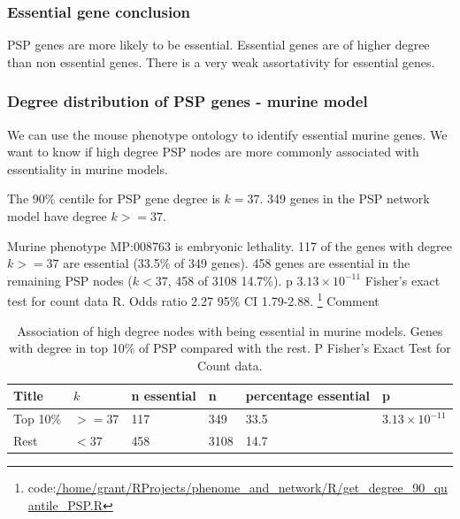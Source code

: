 \subsubsection{Essential gene conclusion}
PSP genes are more likely to be essential. Essential genes are of higher degree than non essential genes. There is a very weak assortativity for essential genes. 


 \subsubsection{Degree distribution of PSP genes - murine model}
 
 We can use the mouse phenotype ontology to identify essential murine genes. 
 We want to know if high degree PSP nodes are more commonly associated with essentiality in murine models. 
 
 The 90\% centile for PSP gene degree is $k=37$. 349 genes in the PSP network model have degree $k>=37$.
 
 Murine phenotype MP:008763 is embryonic lethality. 117 of the genes with degree $k>=37$ are essential (33.5\% of 349 genes). 458 genes are essential in the remaining PSP nodes ($k < 37$, 458 of 3108 14.7\%). p $3.13 \times 10^{-11}$ Fisher's exact test for count data R. Odds ratio 2.27 95\% CI 1.79-2.88. \footnote{code:\url{/home/grant/RProjects/phenome_and_network/R/get_degree_90_quantile_PSP.R}}  Comment 
 
 \begin{table}[h]
     \centering
     \begin{tabular}{llllll}
          Title & $k$& n essential & n & percentage essential & p   \\
          \hline
          Top 10\% & $>=37$ & 117 & 349 & 33.5 & $3.13 \times 10^{-11}$\\
          Rest & $<37$ & 458 & 3108 & 14.7 & \\
     \end{tabular}
     \caption{Association of high degree nodes with being essential in murine models. Genes with degree in top 10\% of PSP compared with the rest. P Fisher's Exact Test for Count data.}
     \label{Table:Degree and murine essentialness PSP}
 \end{table}
 

